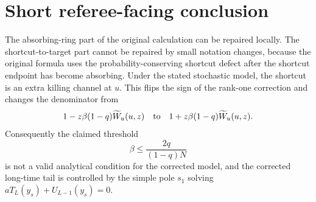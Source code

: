 \documentclass[11pt]{article}
\newcommand{\wt}{\widetilde}
\begin{document}
\section{Short referee-facing conclusion}

The absorbing-ring part of the original calculation can be repaired locally.
The shortcut-to-target part cannot be repaired by small notation changes,
because the original formula uses the probability-conserving shortcut defect
after the shortcut endpoint has become absorbing.  Under the stated stochastic
model, the shortcut is an extra killing channel at $u$.  This flips the sign of
the rank-one correction and changes the denominator from
\[
  1-z\beta(1-q)\wt W_u(u,z)
  \quad\hbox{to}\quad
  1+z\beta(1-q)\wt W_u(u,z).
\]
Consequently the claimed threshold
\[
  \beta\leq \frac{2q}{(1-q)N}
\]
is not a valid analytical condition for the corrected model, and the corrected
long-time tail is controlled by the simple pole $s_1$ solving
$aT_L(y_s)+U_{L-1}(y_s)=0$.
\end{document}
